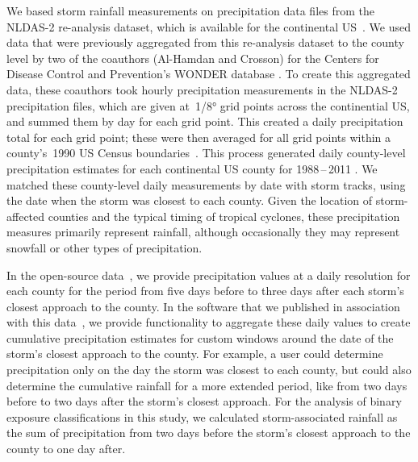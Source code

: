 We based storm rainfall measurements on precipitation data files from the
\ac{NLDAS-2} re-analysis dataset, which is available for the continental
\ac{US}~\parencite{rui2013nldas}. We used data that were previously aggregated
from this re-analysis dataset to the county level by two of the coauthors
(Al-Hamdan and Crosson) for the Centers for Disease Control and Prevention's
\ac{WONDER} database \parencite{cdcwonder, alhamdan2014environmental}. To
create this aggregated data, these coauthors took hourly precipitation
measurements in the \ac{NLDAS-2} precipitation files, which are given
at~1/8\si{\degree} grid points across the continential \ac{US}, and summed them
by day for each grid point.  This created a daily precipitation total for each
grid point; these were then averaged for all grid points within a county's~1990
\ac{US} Census boundaries~\parencite{alhamdan2014environmental, cdcwonder}.
This process generated daily county-level precipitation estimates for each
continental \ac{US} county for 1988\,--\,2011 \parencite{cdcwonder}.  We
matched these county-level daily measurements by date with storm tracks, using
the date when the storm was closest to each county. Given the location of
storm-affected counties and the typical timing of tropical cyclones, these
precipitation measures primarily represent rainfall, although occasionally they
may represent snowfall or other types of precipitation.  

In the open-source data~\parencite{hurricaneexposuredata}, we provide
precipitation values at a daily resolution for each county for the period from
five days before to three days after each storm's closest approach to the
county.  In the software that we published in association with this
data~\parencite{hurricaneexposure}, we provide functionality to aggregate these
daily values to create cumulative precipitation estimates for custom windows
around the date of the storm's closest approach to the county. For example, a
user could determine precipitation only on the day the storm was closest to
each county, but could also determine the cumulative rainfall for a more
extended period, like from two days before to two days after the storm's
closest approach. For the analysis of binary exposure classifications in this
study, we calculated storm-associated rainfall as the sum of precipitation from
two days before the storm's closest approach to the county to one day after.  

